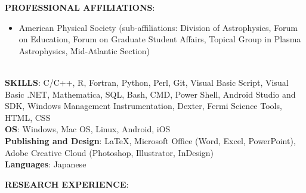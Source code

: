 \documentclass{article}
\begin{document}
\noindent \textbf{PROFESSIONAL AFFILIATIONS}:
\begin{itemize}
\item American Physical Society (sub-affiliations: Division of Astrophysics, Forum on Education, Forum on Graduate Student Affairs, Topical Group in Plasma Astrophysics, Mid-Atlantic Section)
\end{itemize}
\phantom \\
\noindent \textbf{SKILLS}: C/C++, R, Fortran, Python, Perl, Git, Visual Basic Script, Visual Basic .NET, Mathematica, SQL, Bash, CMD, Power Shell, Android Studio and SDK, Windows Management Instrumentation, Dexter, Fermi Science Tools, HTML, CSS\\
\noindent \textbf{OS}: Windows, Mac OS, Linux, Android, iOS\\
\noindent \textbf{Publishing and Design}: LaTeX, Microsoft Office (Word, Excel, PowerPoint), Adobe Creative Cloud (Photoshop, Illustrator, InDesign)\\
\noindent \textbf{Languages}: Japanese\\
\newline 
\par 
\noindent \textbf{RESEARCH EXPERIENCE}:\\
\end{document}
